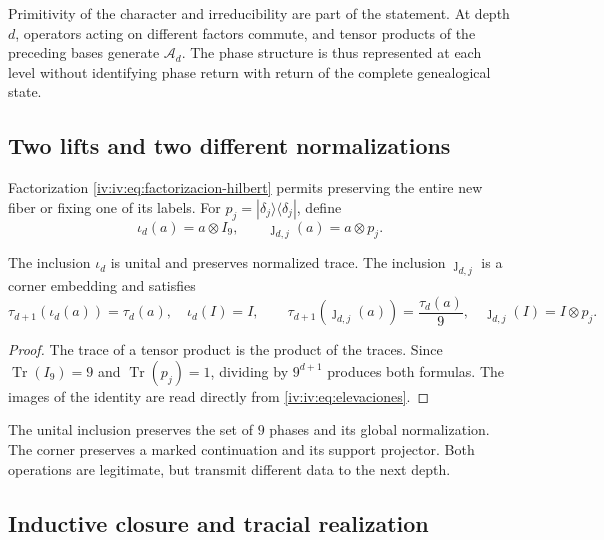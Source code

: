 Primitivity of the character and irreducibility are part of the
statement. At depth \(d\), operators acting on different
factors commute, and tensor products of the preceding bases
generate \(\mathcal A_d\). The phase structure is thus
represented at each level without identifying phase return with
return of the complete genealogical state.

\subsection{Two lifts and two different normalizations}

Factorization \eqref{iv:iv:eq:factorizacion-hilbert} permits preserving
the entire new fiber or fixing one of its labels. For
\(p_j=|\delta_j\rangle\langle\delta_j|\), define
\begin{equation}
 \iota_d(a)=a\otimes I_9,
 \qquad \jmath_{d,j}(a)=a\otimes p_j.
 \label{iv:iv:eq:elevaciones}
\end{equation}
\begin{proposition}
\label{iv:iv:prop:unidad-traza}
The inclusion \(\iota_d\) is unital and preserves normalized trace.
The inclusion \(\jmath_{d,j}\) is a corner embedding and
satisfies
\[
 \tau_{d+1}(\iota_d(a))=\tau_d(a),\quad \iota_d(I)=I,
 \qquad
 \tau_{d+1}(\jmath_{d,j}(a))=\frac{\tau_d(a)}9,
 \quad \jmath_{d,j}(I)=I\otimes p_j.
\]
\end{proposition}
\begin{proof}
The trace of a tensor product is the product of the traces.
Since \(\operatorname{Tr}(I_9)=9\) and
\(\operatorname{Tr}(p_j)=1\), dividing by \(9^{d+1}\)
produces both formulas. The images of the identity are read
directly from \eqref{iv:iv:eq:elevaciones}.
\end{proof}

The unital inclusion preserves the set of \(9\) phases and its
global normalization. The corner preserves a marked continuation and
its support projector. Both operations are legitimate, but
transmit different data to the next depth.

\subsection{Inductive closure and tracial realization}

